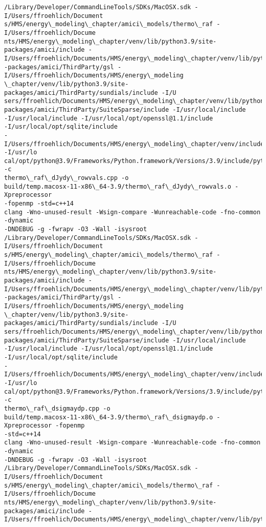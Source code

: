 \documentclass[11pt]{article}
\begin{document}
\begin{Verbatim}[commandchars=\\\{\}]
/Library/Developer/CommandLineTools/SDKs/MacOSX.sdk -I/Users/ffroehlich/Document
s/HMS/energy\_modeling\_chapter/amici\_models/thermo\_raf -I/Users/ffroehlich/Docume
nts/HMS/energy\_modeling\_chapter/venv/lib/python3.9/site-packages/amici/include -
I/Users/ffroehlich/Documents/HMS/energy\_modeling\_chapter/venv/lib/python3.9/site
-packages/amici/ThirdParty/gsl -I/Users/ffroehlich/Documents/HMS/energy\_modeling
\_chapter/venv/lib/python3.9/site-packages/amici/ThirdParty/sundials/include -I/U
sers/ffroehlich/Documents/HMS/energy\_modeling\_chapter/venv/lib/python3.9/site-
packages/amici/ThirdParty/SuiteSparse/include -I/usr/local/include
-I/usr/local/include -I/usr/local/opt/openssl@1.1/include
-I/usr/local/opt/sqlite/include
-I/Users/ffroehlich/Documents/HMS/energy\_modeling\_chapter/venv/include -I/usr/lo
cal/opt/python@3.9/Frameworks/Python.framework/Versions/3.9/include/python3.9 -c
thermo\_raf\_dJydy\_rowvals.cpp -o
build/temp.macosx-11-x86\_64-3.9/thermo\_raf\_dJydy\_rowvals.o -Xpreprocessor
-fopenmp -std=c++14
clang -Wno-unused-result -Wsign-compare -Wunreachable-code -fno-common -dynamic
-DNDEBUG -g -fwrapv -O3 -Wall -isysroot
/Library/Developer/CommandLineTools/SDKs/MacOSX.sdk -I/Users/ffroehlich/Document
s/HMS/energy\_modeling\_chapter/amici\_models/thermo\_raf -I/Users/ffroehlich/Docume
nts/HMS/energy\_modeling\_chapter/venv/lib/python3.9/site-packages/amici/include -
I/Users/ffroehlich/Documents/HMS/energy\_modeling\_chapter/venv/lib/python3.9/site
-packages/amici/ThirdParty/gsl -I/Users/ffroehlich/Documents/HMS/energy\_modeling
\_chapter/venv/lib/python3.9/site-packages/amici/ThirdParty/sundials/include -I/U
sers/ffroehlich/Documents/HMS/energy\_modeling\_chapter/venv/lib/python3.9/site-
packages/amici/ThirdParty/SuiteSparse/include -I/usr/local/include
-I/usr/local/include -I/usr/local/opt/openssl@1.1/include
-I/usr/local/opt/sqlite/include
-I/Users/ffroehlich/Documents/HMS/energy\_modeling\_chapter/venv/include -I/usr/lo
cal/opt/python@3.9/Frameworks/Python.framework/Versions/3.9/include/python3.9 -c
thermo\_raf\_dsigmaydp.cpp -o
build/temp.macosx-11-x86\_64-3.9/thermo\_raf\_dsigmaydp.o -Xpreprocessor -fopenmp
-std=c++14
clang -Wno-unused-result -Wsign-compare -Wunreachable-code -fno-common -dynamic
-DNDEBUG -g -fwrapv -O3 -Wall -isysroot
/Library/Developer/CommandLineTools/SDKs/MacOSX.sdk -I/Users/ffroehlich/Document
s/HMS/energy\_modeling\_chapter/amici\_models/thermo\_raf -I/Users/ffroehlich/Docume
nts/HMS/energy\_modeling\_chapter/venv/lib/python3.9/site-packages/amici/include -
I/Users/ffroehlich/Documents/HMS/energy\_modeling\_chapter/venv/lib/python3.9/site

\end{Verbatim}
\end{document}

